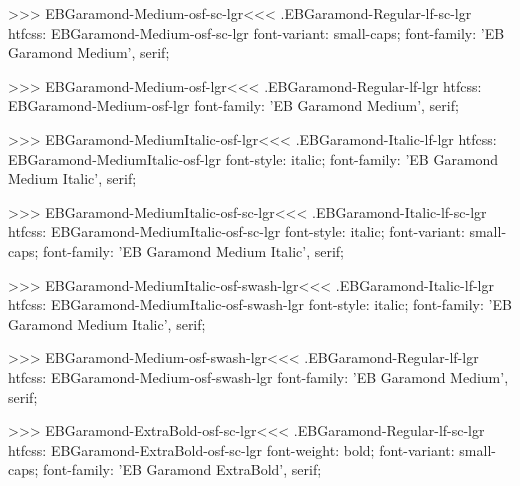 >>>
\<EBGaramond-Medium-osf-sc-lgr\><<<
.EBGaramond-Regular-lf-sc-lgr
htfcss:  EBGaramond-Medium-osf-sc-lgr  font-variant: small-caps; font-family: 'EB Garamond Medium', serif;

>>>
\<EBGaramond-Medium-osf-lgr\><<<
.EBGaramond-Regular-lf-lgr
htfcss:  EBGaramond-Medium-osf-lgr  font-family: 'EB Garamond Medium', serif;

>>>
\<EBGaramond-MediumItalic-osf-lgr\><<<
.EBGaramond-Italic-lf-lgr
htfcss:  EBGaramond-MediumItalic-osf-lgr  font-style: italic; font-family: 'EB Garamond Medium Italic', serif;

>>>
\<EBGaramond-MediumItalic-osf-sc-lgr\><<<
.EBGaramond-Italic-lf-sc-lgr
htfcss:  EBGaramond-MediumItalic-osf-sc-lgr  font-style: italic; font-variant: small-caps; font-family: 'EB Garamond Medium Italic', serif;

>>>
\<EBGaramond-MediumItalic-osf-swash-lgr\><<<
.EBGaramond-Italic-lf-lgr
htfcss:  EBGaramond-MediumItalic-osf-swash-lgr  font-style: italic; font-family: 'EB Garamond Medium Italic', serif;

>>>
\<EBGaramond-Medium-osf-swash-lgr\><<<
.EBGaramond-Regular-lf-lgr
htfcss:  EBGaramond-Medium-osf-swash-lgr  font-family: 'EB Garamond Medium', serif;

>>>
\<EBGaramond-ExtraBold-osf-sc-lgr\><<<
.EBGaramond-Regular-lf-sc-lgr
htfcss:  EBGaramond-ExtraBold-osf-sc-lgr  font-weight: bold; font-variant: small-caps; font-family: 'EB Garamond ExtraBold', serif;

